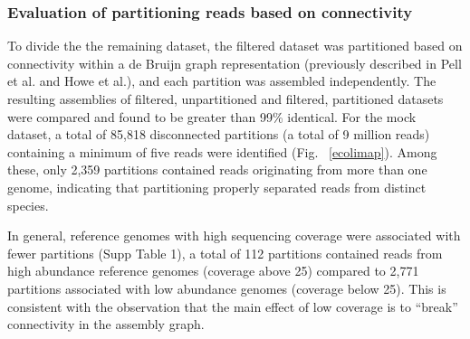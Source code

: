 \documentclass[11pt]{article} %
\begin{document}
\subsubsection{Evaluation of partitioning reads based on connectivity}
To divide the the remaining dataset, the filtered dataset was
partitioned based on connectivity within a de Bruijn graph
representation (previously described in Pell et al. and Howe et al.),
and each partition was assembled independently.  The resulting
assemblies of filtered, unpartitioned and filtered, partitioned
datasets were compared and found to be greater than 99\% identical.
For the mock dataset, a total of 85,818 disconnected partitions (a
total of 9 million reads) containing a minimum of five reads were
identified (Fig. ~\ref{ecolimap}).  Among these, only 2,359 partitions
contained reads originating from more than one genome, indicating that
partitioning properly separated reads from distinct species.


In general, reference genomes with high sequencing coverage were
associated with fewer partitions (Supp Table 1), a
total of 112 partitions contained reads from high abundance reference
genomes (coverage above 25) compared to 2,771 partitions associated
with low abundance genomes (coverage below 25).  This is consistent
with the observation that the main effect of low coverage is to
``break'' connectivity in the assembly graph.

\end{document}
